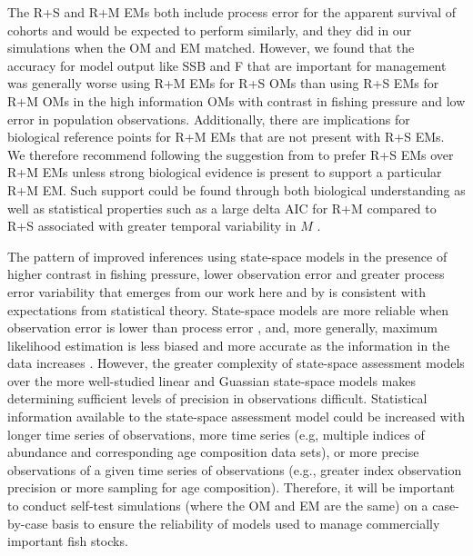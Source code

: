 \documentclass[
  12pt,
]{article}
\begin{document}
The R+S and R+M EMs both include process error for the apparent survival of cohorts and would be expected to perform similarly, and they did in our simulations when the OM and EM matched. However, we found that the accuracy for model output like SSB and F that are important for management was generally worse using R+M EMs for R+S OMs than using R+S EMs for R+M OMs in the high information OMs with contrast in fishing pressure and low error in population observations. Additionally, there are implications for biological reference points for R+M EMs \citep[e.g.,][]{legaultpalmer16} that are not present with R+S EMs. We therefore recommend following the suggestion from \citet{lietal24} to prefer R+S EMs over R+M EMs unless strong biological evidence is present to support a particular R+M EM. Such support could be found through both biological understanding \citep[e.g.,][]{trijouletetal20} as well as statistical properties such as a large delta AIC for R+M compared to R+S associated with greater temporal variability in \(M\) \citep{milleretal_inreview1}.

The pattern of improved inferences using state-space models in the presence of higher contrast in fishing pressure, lower observation error and greater process error variability that emerges from our work here and by \citet{milleretal_inreview} is consistent with expectations from statistical theory. State-space models are more reliable when observation error is lower than process error \citep{augermetheetal16}, and, more generally, maximum likelihood estimation is less biased and more accurate as the information in the data increases \citep{neymanscott48, kieferwolfowitz56}. However, the greater complexity of state-space assessment models over the more well-studied linear and Guassian state-space models makes determining sufficient levels of precision in observations difficult. Statistical information available to the state-space assessment model could be increased with longer time series of observations, more time series (e.g, multiple indices of abundance and corresponding age composition data sets), or more precise observations of a given time series of observations (e.g., greater index observation precision or more sampling for age composition). Therefore, it will be important to conduct self-test simulations (where the OM and EM are the same) on a case-by-case basis to ensure the reliability of models used to manage commercially important fish stocks.
\end{document}
